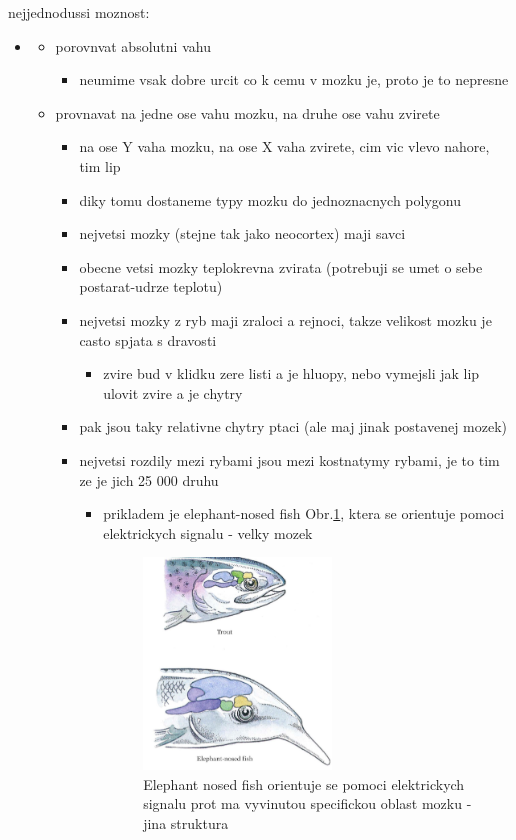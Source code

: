 \documentclass[journal,onecolumn]{IEEEtrancz}
\begin{document}
nejjednodussi moznost:
\begin{itemize}
	\item 
	\begin{itemize}
		\item porovnvat absolutni vahu 
		\begin{itemize}
			\item neumime vsak dobre urcit co k cemu v mozku je, proto je to nepresne
		\end{itemize}

		\item provnavat na jedne ose vahu mozku, na druhe ose vahu zvirete
		\begin{itemize}
			\item na ose Y vaha mozku, na ose X vaha zvirete, cim vic vlevo nahore, tim lip
			\item diky tomu dostaneme typy mozku do jednoznacnych polygonu
				\vspace{3mm}
			\item nejvetsi mozky (stejne tak jako neocortex) maji savci
			\item obecne vetsi mozky teplokrevna zvirata (potrebuji se umet o sebe postarat-udrze teplotu)
			\item nejvetsi mozky z ryb maji zraloci a rejnoci, takze velikost mozku je casto spjata s dravosti 
			\begin{itemize}
				\item zvire bud v klidku zere listi a je hluopy, nebo vymejsli jak lip ulovit zvire a je chytry
			\end{itemize}

			\item pak jsou taky relativne chytry ptaci (ale maj jinak postavenej mozek)
			\item nejvetsi rozdily mezi rybami jsou mezi kostnatymy rybami, je to tim ze je jich 25 000 druhu
			\begin{itemize}
				\item prikladem je elephant-nosed fish Obr.\ref{elephant}, ktera se orientuje pomoci elektrickych signalu - velky mozek

				\begin{figure}[ht]
					\centering
						\includegraphics[width=5.0cm]{fig/elephant.png}
					\caption{Elephant nosed fish  orientuje se pomoci elektrickych signalu prot ma vyvinutou specifickou oblast mozku - jina struktura}
					\label{elephant}
				\end{figure}


\end{itemize}
\end{itemize}
\end{itemize}
\end{itemize}
\end{document}
